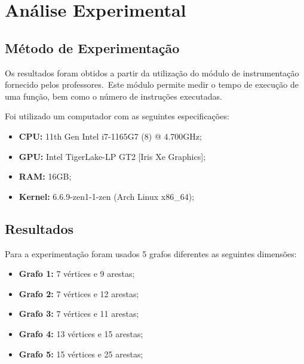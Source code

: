 \chapter{Análise Experimental}
\label{ch:analise-experimental}

\section{Método de Experimentação}
\label{sec:analise-experimental:metodo-de-experimentacao}

Os resultados foram obtidos a partir da utilização do módulo de instrumentação fornecido pelos professores.\ Este módulo permite medir o tempo de execução de uma função, bem como o número de instruções executadas.

Foi utilizado um computador com as seguintes especificações:

\begin{itemize}
    \item \textbf{CPU:} 11th Gen Intel i7-1165G7 (8) @ 4.700GHz;
    \item \textbf{GPU:} Intel TigerLake-LP GT2 [Iris Xe Graphics];
    \item \textbf{RAM:} 16GB;
    \item \textbf{Kernel:} 6.6.9-zen1-1-zen (Arch Linux x86\_64);
\end{itemize}

\section{Resultados}
\label{sec:analise-experimental:resultados}

Para a experimentação foram usados 5 grafos diferentes as seguintes dimensões:

\begin{itemize}
    \item \textbf{Grafo 1:} 7 vértices e 9 arestas;
    \item \textbf{Grafo 2:} 7 vértices e 12 arestas;
    \item \textbf{Grafo 3:} 7 vértices e 11 arestas;
    \item \textbf{Grafo 4:} 13 vértices e 15 arestas;
    \item \textbf{Grafo 5:} 15 vértices e 25 arestas;
\end{itemize}

